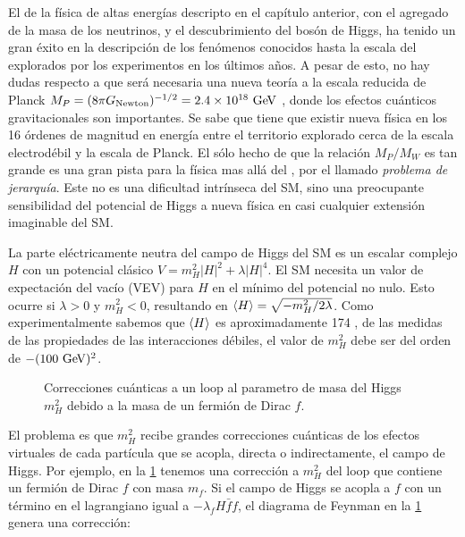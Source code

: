 El {\SM} de la física de altas energías descripto en el capítulo anterior, con
el agregado de la masa de los neutrinos, y el descubrimiento del bosón de Higgs,
ha tenido un gran éxito en la descripción de los fenómenos conocidos hasta la
escala del {\tev} explorados por los experimentos en los últimos a\~nos.
A pesar de esto, no hay dudas respecto a que será necesaria una nueva teoría
a la escala reducida de Planck $M_P = (8\pi G_\text{Newton})^{-1/2} = 2.4 \times
10^{18} \gev$ , donde los efectos cuánticos gravitacionales son importantes.
Se sabe que tiene que existir nueva física en los 16 órdenes de magnitud en
energía entre el territorio explorado cerca de la escala electrodébil y la
escala de Planck. El sólo hecho de que la relación $M_P/M_W$ es tan grande es
una gran pista para la física mas allá del {\SM}, por el llamado \emph{problema
  de jerarquía}. Este no es una dificultad intrínseca del SM, sino una
preocupante sensibilidad del potencial de Higgs a nueva física en casi cualquier
extensión imaginable del SM.

La parte eléctricamente neutra del campo de Higgs del SM es un escalar complejo
$H$ con un potencial clásico $V=m_H^2 |H|^2 + \lambda|H|^4$. El SM necesita un
valor de expectación del vacío (VEV) para $H$ en el mínimo del potencial no
nulo. Esto ocurre si $\lambda>0$ y $m_H^2<0$, resultando en $\langle H \rangle =
\sqrt{-m_H^2/2\lambda}$. Como experimentalmente sabemos que $\langle H \rangle$ es
aproximadamente 174 \gev, de las medidas de las propiedades de las interacciones
débiles, el valor de $m_H^2$ debe ser del orden de $-(100 \gev)^2$.

\begin{figure}[!htbp]
  \centering 
  \caption{Correcciones cuánticas a un loop al parametro de masa del Higgs
    $m_H^2$ debido a la masa de un fermión de Dirac $f$.}
  \label{fig:higgs_correction_f}
\end{figure}

El problema es que $m_H^2$ recibe grandes correcciones cuánticas de los efectos
virtuales de cada partícula que se acopla, directa o indirectamente, el
campo de Higgs. Por ejemplo, en la \cref{fig:higgs_correction_f} tenemos una
corrección a $m_H^2$ del loop que contiene un fermión de Dirac $f$ con masa
$m_f$. Si el campo de Higgs se acopla a $f$ con un término en el lagrangiano
igual a $-\lambda_f H \bar{f}f$, el diagrama de Feynman en la
\cref{fig:higgs_correction_f} genera una corrección:

